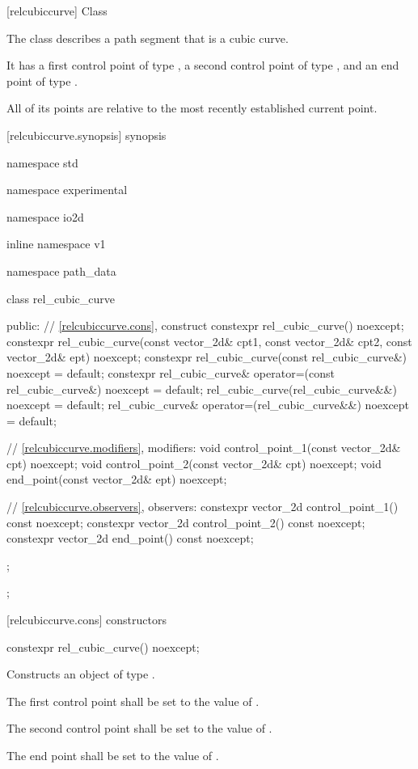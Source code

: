  [relcubiccurve] {Class }

\pnum
{}
The class  describes a path segment that is a cubic \bezierlocal curve.

\pnum
It has a first control point of type , a second control point of type , and an end point of type .

\pnum
All of its points are relative to the most recently established current point.

 [relcubiccurve.synopsis] { synopsis}

\begin{codeblock}
namespace std { namespace experimental { namespace io2d { inline namespace v1 {
  namespace path_data {
    class rel_cubic_curve {
    public:
      // \ref{relcubiccurve.cons}, construct
      constexpr rel_cubic_curve() noexcept;
      constexpr rel_cubic_curve(const vector_2d& cpt1, const vector_2d& cpt2,
        const vector_2d& ept) noexcept;
      constexpr rel_cubic_curve(const rel_cubic_curve&) noexcept = default;
      constexpr rel_cubic_curve& operator=(const rel_cubic_curve&) noexcept =
        default;
      rel_cubic_curve(rel_cubic_curve&&) noexcept = default;
      rel_cubic_curve& operator=(rel_cubic_curve&&) noexcept = default;

      // \ref{relcubiccurve.modifiers}, modifiers:
      void control_point_1(const vector_2d& cpt) noexcept;
      void control_point_2(const vector_2d& cpt) noexcept;
      void end_point(const vector_2d& ept) noexcept;

      // \ref{relcubiccurve.observers}, observers:
      constexpr vector_2d control_point_1() const noexcept;
      constexpr vector_2d control_point_2() const noexcept;
      constexpr vector_2d end_point() const noexcept;
    };
  };
} } } }
\end{codeblock}

 [relcubiccurve.cons] { constructors}

\begin{itemdecl}
constexpr rel_cubic_curve() noexcept;
\end{itemdecl}
\begin{itemdescr}
\pnum
\effects
Constructs an object of type .

\pnum
The first control point shall be set to the value of .

\pnum
The second control point shall be set to the value of .

\pnum
The end point shall be set to the value of .
\end{itemdescr}

